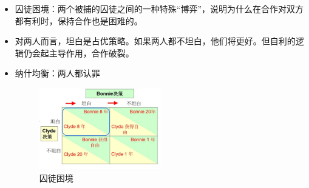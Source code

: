 \documentclass[12pt, a4paper]{article}
\begin{document}
\begin{itemize}
  \item 囚徒困境：两个被捕的囚徒之间的一种特殊“博弈”，说明为什么在合作对双方都有利时，保持合作也是困难的。
  \item 对两人而言，坦白是占优策略。如果两人都不坦白，他们将更好。但自利的逻辑仍会起主导作用，合作破裂。
  \item 纳什均衡：两人都认罪
  
  \begin{figure}[H] 
    \centering %
    \includegraphics[width=0.5\textwidth]{囚徒困境.png} 
    \caption{囚徒困境} %
  \end{figure}

\end{itemize}
\end{document}
